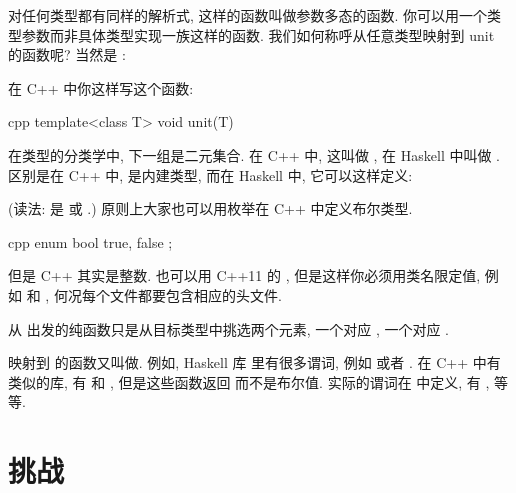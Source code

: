 对任何类型都有同样的解析式, 这样的函数叫做参数多态的函数. 你可以用一个类型参数而非具体类型实现一族这样的函数.
我们如何称呼从任意类型映射到 unit 的函数呢? 当然是 :

在 C++ 中你这样写这个函数:

\begin{snip}{cpp}
template<class T>
void unit(T) {}
\end{snip}
在类型的分类学中, 下一组是二元集合. 在 C++ 中, 这叫做 , 在 Haskell 中叫做 .
区别是在 C++ 中,  是内建类型, 而在 Haskell 中, 它可以这样定义:

(读法:  是  或 .) 原则上大家也可以用枚举在 C++ 中定义布尔类型.

\begin{snip}{cpp}
enum bool {
    true,
    false
};
\end{snip}

但是 C++  其实是整数. 也可以用 C++11 的 , 但是这样你必须用类名限定值,
例如  和 , 何况每个文件都要包含相应的头文件.

从  出发的纯函数只是从目标类型中挑选两个元素, 一个对应 , 一个对应 .

映射到  的函数又叫做. 例如, Haskell 库  里有很多谓词,
例如  或者 . 在 C++ 中有类似的库, 有  和 ,
但是这些函数返回  而不是布尔值. 实际的谓词在  中定义, 有 ,
 等等.

\section{挑战}

